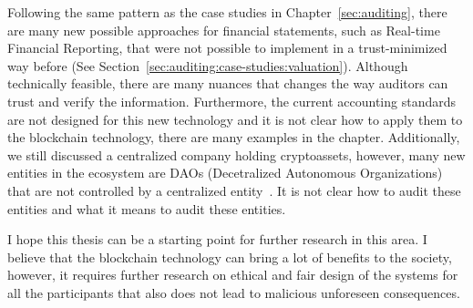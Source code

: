 Following the same pattern as the case studies in Chapter~\ref{sec:auditing}, there are many new possible approaches for financial statements, such as Real-time Financial Reporting, that were not possible to implement in a trust-minimized way before (See Section~\ref{sec:auditing:case-studies:valuation}). Although technically feasible, there are many nuances that changes the way auditors can trust and verify the information. Furthermore, the current accounting standards are not designed for this new technology and it is not clear how to apply them to the blockchain technology, there are many examples in the chapter. Additionally, we still discussed a centralized company holding cryptoassets, however, many new entities in the ecosystem are DAOs (Decetralized Autonomous Organizations) that are not controlled by a centralized entity~\cite{tan2023open}. It is not clear how to audit these entities and what it means to audit these entities.

I hope this thesis can be a starting point for further research in this area. I believe that the blockchain technology can bring a lot of benefits to the society, however, it requires further research on ethical and fair design of the systems for all the participants that also does not lead to malicious unforeseen consequences.



